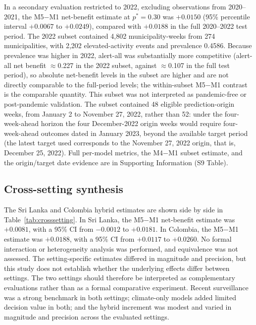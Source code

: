 \documentclass[11pt,a4paper]{article}
\begin{document}
In a secondary evaluation restricted to 2022, excluding observations from 2020--2021, the M5$-$M1 net-benefit estimate at $p^*=0.30$ was $+0.0150$ (95\% percentile interval $+0.0067$ to $+0.0249$), compared with $+0.0188$ in the full 2020--2022 test period. The 2022 subset contained 4{,}802 municipality-weeks from 274 municipalities, with 2{,}202 elevated-activity events and prevalence 0.4586. Because prevalence was higher in 2022, alert-all was substantially more competitive (alert-all net benefit $\approx$0.227 in the 2022 subset, against $\approx$0.107 in the full test period), so absolute net-benefit levels in the subset are higher and are not directly comparable to the full-period levels; the within-subset M5$-$M1 contrast is the comparable quantity. This subset was not interpreted as pandemic-free or post-pandemic validation. The subset contained 48 eligible prediction-origin weeks, from January 2 to November 27, 2022, rather than 52: under the four-week-ahead horizon the four December-2022 origin weeks would require four-week-ahead outcomes dated in January 2023, beyond the available target period (the latest target used corresponds to the November 27, 2022 origin, that is, December 25, 2022). Full per-model metrics, the M4$-$M1 subset estimate, and the origin/target date evidence are in Supporting Information (S9 Table).

\subsection{Cross-setting synthesis}
The Sri Lanka and Colombia hybrid estimates are shown side by side in Table~\ref{tab:crosssetting}. In Sri Lanka, the M5$-$M1 net-benefit estimate was $+0.0081$, with a 95\% CI from $-0.0012$ to $+0.0181$. In Colombia, the M5$-$M1 estimate was $+0.0188$, with a 95\% CI from $+0.0117$ to $+0.0260$. No formal interaction or heterogeneity analysis was performed, and equivalence was not assessed. The setting-specific estimates differed in magnitude and precision, but this study does not establish whether the underlying effects differ between settings. The two settings should therefore be interpreted as complementary evaluations rather than as a formal comparative experiment. Recent surveillance was a strong benchmark in both settings; climate-only models added limited decision value in both; and the hybrid increment was modest and varied in magnitude and precision across the evaluated settings.
\end{document}
